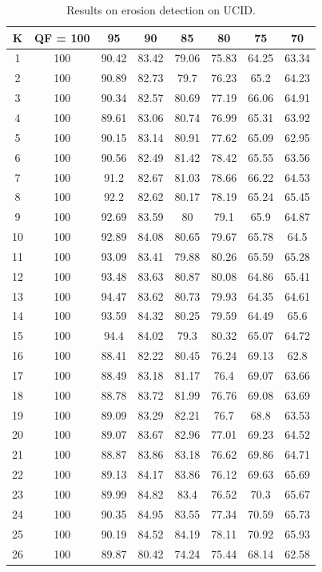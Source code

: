 \documentclass[review]{elsarticle}
\begin{document}
	\begin{longtable}{c|ccccccc}
		\caption{Results on erosion detection on UCID.}
		\label{table:uciderosion}	\\
		\hline\hline
		\textbf{K}&\textbf{QF = 100}&\textbf{95}&\textbf{90}&\textbf{85}&\textbf{80}&\textbf{75}&\textbf{70}\\
		\hline
		1&100&90.42&83.42&79.06&75.83&64.25&63.34\\
		2&100&90.89&82.73&79.7&76.23&65.2&64.23\\
		3&100&90.34&82.57&80.69&77.19&66.06&64.91\\
		4&100&89.61&83.06&80.74&76.99&65.31&63.92\\
		5&100&90.15&83.14&80.91&77.62&65.09&62.95\\
		6&100&90.56&82.49&81.42&78.42&65.55&63.56\\
		7&100&91.2&82.67&81.03&78.66&66.22&64.53\\
		8&100&92.2&82.62&80.17&78.19&65.24&65.45\\
		9&100&92.69&83.59&80&79.1&65.9&64.87\\
		10&100&92.89&84.08&80.65&79.67&65.78&64.5\\
		11&100&93.09&83.41&79.88&80.26&65.59&65.28\\
		12&100&93.48&83.63&80.87&80.08&64.86&65.41\\
		13&100&94.47&83.62&80.73&79.93&64.35&64.61\\
		14&100&93.59&84.32&80.25&79.59&64.49&65.6\\
		15&100&94.4&84.02&79.3&80.32&65.07&64.72\\
		16&100&88.41&82.22&80.45&76.24&69.13&62.8\\
		17&100&88.49&83.18&81.17&76.4&69.07&63.66\\
		18&100&88.78&83.72&81.99&76.76&69.08&63.69\\
		19&100&89.09&83.29&82.21&76.7&68.8&63.53\\
		20&100&89.07&83.67&82.96&77.01&69.23&64.52\\
		21&100&88.87&83.86&83.18&76.62&69.86&64.71\\
		22&100&89.13&84.17&83.86&76.12&69.63&65.69\\
		23&100&89.99&84.82&83.4&76.52&70.3&65.67\\
		24&100&90.35&84.95&83.55&77.34&70.59&65.73\\
		25&100&90.19&84.52&84.19&78.11&70.92&65.93\\
		26&100&89.87&80.42&74.24&75.44&68.14&62.58\\

\end{longtable}
\end{document}
